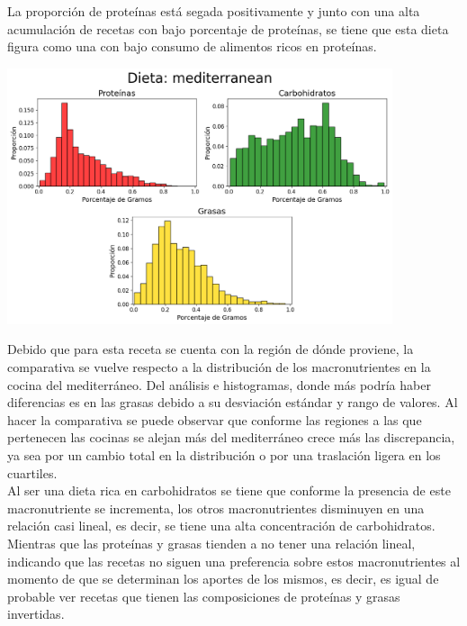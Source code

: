 \documentclass[12pt,a4paper]{article}
\begin{document}
            La proporción de proteínas está segada positivamente y junto con una 
            alta acumulación de recetas con bajo porcentaje de proteínas, se tiene que 
            esta dieta figura como una con bajo consumo de alimentos ricos en proteínas. 
            
            \begin{center}
                \includegraphics[width=0.85\textwidth]{Resources/2_03_plot_03.png}
            \end{center}

            Debido que para esta receta se cuenta con la región de dónde proviene, la 
            comparativa se vuelve respecto a la distribución de los macronutrientes en 
            la cocina del mediterráneo. Del análisis e histogramas, donde más podría haber 
            diferencias es en las grasas debido a su desviación estándar y rango de valores. 
            Al hacer la comparativa se puede observar que conforme las regiones a las que 
            pertenecen las cocinas se alejan más del mediterráneo crece más las discrepancia, 
            ya sea por un cambio total en la distribución o por una traslación ligera en los 
            cuartiles.\\

            Al ser una dieta rica en carbohidratos se tiene que conforme la presencia de 
            este macronutriente se incrementa, los otros macronutrientes disminuyen en 
            una relación casi lineal, es decir, se tiene una alta concentración de carbohidratos. 
            Mientras que las proteínas y grasas tienden a no tener una relación lineal, indicando 
            que las recetas no siguen una preferencia sobre estos macronutrientes al momento de 
            que se determinan los aportes de los mismos, es decir, es igual de probable ver 
            recetas que tienen las composiciones de proteínas y grasas invertidas.
\end{document}
